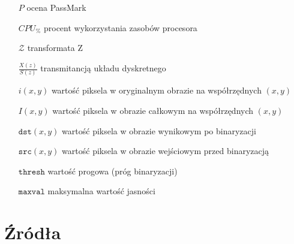 \documentclass[a4paper,twoside,12pt]{book}
\begin{document}
\begin{appendices}
\begin{itemize}
\item[$P$] ocena PassMark 
\item[$CPU_{\%}$] procent wykorzystania zasobów procesora
\item[$\mathcal{Z}$] transformata Z
\item[$\frac{X(z)}{S(z)}$] transmitancją układu dyskretnego
\item[$i(x,y)$] wartość piksela w oryginalnym obrazie na współrzędnych $(x,y)$
\item[$I(x,y)$] wartość piksela w obrazie całkowym na współrzędnych $(x,y)$
\item[$\texttt{dst}(x,y)$] wartość piksela w obrazie wynikowym po binaryzacji
\item[$\texttt{src}(x,y)$] wartość piksela w obrazie wejściowym przed binaryzacją
\item[$\texttt{thresh}$] wartość progowa (próg binaryzacji)
\item[$\texttt{maxval}$] maksymalna wartość jasności

\end{itemize}


%
%
%
\chapter{Źródła}





%
%
%

\end{appendices}
\end{document}
